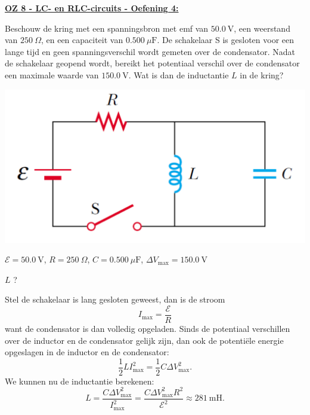 \textbf{\underline{OZ 8 - LC- en  RLC-circuits - Oefening 4:}}
\vspace{0.5cm}

Beschouw de kring met een spanningsbron met emf van $50.0 \ \text{V}$, een weerstand van $250 \ \Omega$, en een capaciteit van $0.500 \ \mu \text{F}$. De schakelaar S is gesloten voor een lange tijd en geen spanningsverschil wordt gemeten over de condensator. Nadat de schakelaar geopend wordt, bereikt het potentiaal verschil over de condensator een maximale waarde van $150.0 \ \text{V}$. Wat is dan de inductantie $L$ in de kring?

\begin{center}
    \includegraphics[scale = 0.3]{oz08/resources/Oz8Oef4.png}
\end{center}
    
\begin{description}[labelwidth=1.5cm, leftmargin=!]
    \item[Geg. :]  $\mathcal{E} = 50.0 \ \text{V}$, $R = 250 \ \Omega$, $C = 0.500 \ \mu \text{F}$, $\Delta V_{\text{max}} = 150.0 \ \text{V}$
    \item[Gevr. :] $L$ ?
    \item[Opl. :] 
        Stel de schakelaar is lang gesloten geweest, dan is de stroom 
        \begin{equation*}
            I_{\text{max}} = \frac{\mathcal{E}}{R}
        \end{equation*}
        want de condensator is dan volledig opgeladen. Sinds de potentiaal verschillen over de inductor en de condensator gelijk zijn, dan ook de potentiële energie opgeslagen in de inductor en de condensator:
        \begin{equation*}
            \frac{1}{2}LI_{\text{max}}^2 = \frac{1}{2}C\Delta V_{\text{max}}^2. 
        \end{equation*}
        We kunnen nu de inductantie berekenen:
        \begin{equation*}
            L = \frac{C\Delta V_{\text{max}}^2}{I_{\text{max}}^2} = \frac{C\Delta V_{\text{max}}^2R^2}{\mathcal{E}^2} \approx 281 \ \text{mH}.
        \end{equation*}

\end{description}

\vspace{1cm}